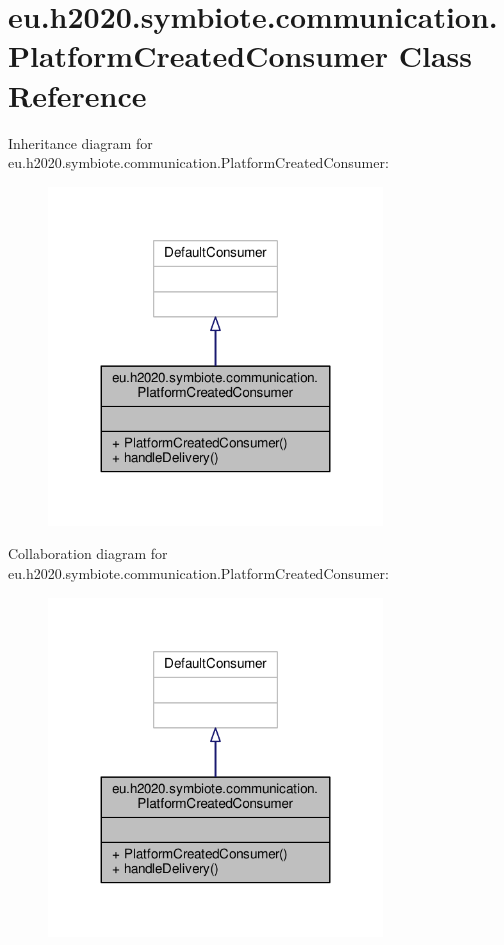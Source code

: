 \hypertarget{classeu_1_1h2020_1_1symbiote_1_1communication_1_1PlatformCreatedConsumer}{}\section{eu.\+h2020.\+symbiote.\+communication.\+Platform\+Created\+Consumer Class Reference}
\label{classeu_1_1h2020_1_1symbiote_1_1communication_1_1PlatformCreatedConsumer}


Inheritance diagram for eu.\+h2020.\+symbiote.\+communication.\+Platform\+Created\+Consumer\+:
\nopagebreak
\begin{figure}[H]
\begin{center}
\leavevmode
\includegraphics[width=251pt]{classeu_1_1h2020_1_1symbiote_1_1communication_1_1PlatformCreatedConsumer__inherit__graph}
\end{center}
\end{figure}


Collaboration diagram for eu.\+h2020.\+symbiote.\+communication.\+Platform\+Created\+Consumer\+:
\nopagebreak
\begin{figure}[H]
\begin{center}
\leavevmode
\includegraphics[width=251pt]{classeu_1_1h2020_1_1symbiote_1_1communication_1_1PlatformCreatedConsumer__coll__graph}
\end{center}
\end{figure}
